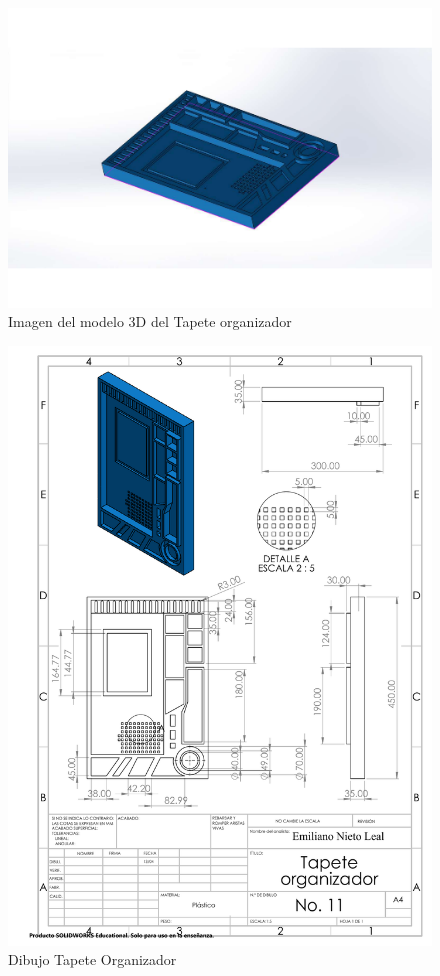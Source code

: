         \begin{figure}[H]
        \centering
        \includegraphics[trim = {65mm 55mm 65mm 55mm},clip,scale=0.5]{19/Img/tapeteOrganizadorFigura.pdf}
        \caption{Imagen del modelo 3D del Tapete organizador}
        \label{fig:tapete}
    \end{figure}
    
    \newpage
                \begin{figure}[H]
        \centering
        \includegraphics[trim = {1mm 1mm 1mm 1mm},clip,scale=0.35]{19/Img/tapeteOrganizadorDibujo.pdf}
        \caption{Dibujo Tapete Organizador}
        \label{fig:tapeteOrganizador}
    \end{figure}
    
